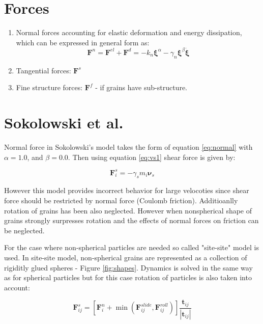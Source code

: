 \documentclass[10pt,a4paper]{article}
\begin{document}
\section{Forces}
\begin{enumerate}
 \item Normal forces accounting for elastic deformation and energy dissipation, which can be expressed in general form as:
 \begin{equation}\label{eq:normal}
  \mathbf{F}^{n} = \mathbf{F}^{el} + \mathbf{F}^{d} = -k_n\mathbf{\xi}^{\alpha} - \gamma_n \mathbf{\xi}^{\beta}\dot{\mathbf{\xi}}
 \end{equation}


 \item Tangential forces: $\mathbf{F}^{s}$
 \item Fine structure forces: $\mathbf{F}^{f}$ - if grains have sub-structure.

\end{enumerate}


\section{Sokolowski et al. \cite{sok92, sok93}}
Normal force in Sokolowski's model takes the form of equation \ref{eq:normal} with $\alpha=1.0$, and $\beta=0.0$.
Then using equation \ref{eq:vs1} shear force is given by:

\begin{equation}
  \mathbf{F}^{s}_i = -\gamma_s m_i \mathbf{\nu}_s
\end{equation}

However this model provides incorrect behavior for large velocoties since shear force should be restricted 
by normal force (Coulomb friction). Additioanlly rotation of grains has been also neglected. 
However when nonspherical shape of grains  strongly surpresses rotation and the effects of normal forces on friction can be neglected.

For the case where non-spherical particles are needed so called "site-site" model is used. In site-site model, non-spherical
grains are represented as a collection of rigiditly glued spheres - Figure \ref{fig:shapes}.
Dynamics is solved in the same way as for spherical particles but for this case rotation of particles is also taken into account:

\begin{equation}
 \mathbf{F}^{s}_{ij} = \left[\mathbf{F}^{n}_i + \min(\mathbf{F}^{slide}_{ij}, \mathbf{F}^{roll}_{ij})\right]  \frac{ \mathbf{t}_{ij} } { |\mathbf{t}_{ij}| }
\end{equation}
\end{document}
